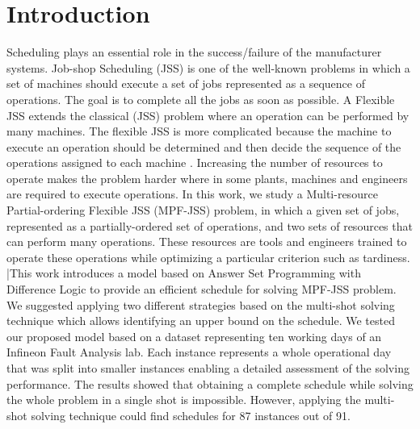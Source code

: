 \documentclass[submission,copyright,creativecommons]{eptcs}
\begin{document}
\section{Introduction}
Scheduling plays an essential role in the success/failure of the manufacturer systems. Job-shop Scheduling (JSS) is one of the well-known problems in which a set of machines should execute a set of jobs represented as a sequence of operations. The goal is to complete all the jobs as soon as possible. A Flexible JSS extends the classical (JSS) problem where an operation can be performed by many machines. The flexible JSS is more complicated because the machine to execute an operation should be determined and then decide the sequence of the operations assigned to each machine \cite{brucker1990job}. Increasing the number of resources to operate makes the problem harder where in some plants, machines and engineers are required to execute operations. In this work, we study a Multi-resource Partial-ordering Flexible JSS (MPF-JSS) problem\cite{dauzere1998multi}, in which a given set of jobs, represented as a partially-ordered set of operations, and two sets of resources that can perform many operations. These resources are tools and engineers trained to operate these operations while optimizing a particular criterion such as tardiness. |This work introduces a model based on Answer Set Programming with Difference Logic \cite{gebser2016theory} to provide an efficient schedule for solving MPF-JSS problem. We suggested applying two different strategies based on the multi-shot solving technique \cite{gebser2019multi} which allows identifying an upper bound on the schedule. We tested our proposed model based on a dataset representing ten working days of an Infineon Fault Analysis lab. Each instance represents a whole operational day that was split into smaller instances enabling a detailed assessment of the solving performance. The results showed that obtaining a complete schedule while solving the whole problem in a single shot is impossible. However, applying the multi-shot solving technique could find schedules for 87 instances out of 91. 
\end{document}
